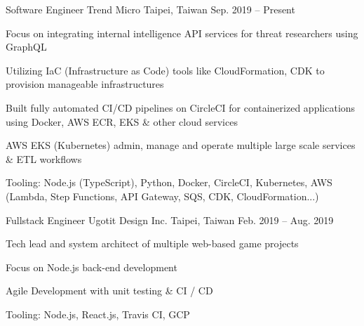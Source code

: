 

\begin{cventries}

  \cventry
    {Software Engineer} %
    {Trend Micro} %
    {Taipei, Taiwan} %
    {Sep. 2019 -- Present} %
    {
      \begin{cvitems} %
        \item {Focus on integrating internal intelligence API services for threat researchers using GraphQL}
        \item {Utilizing IaC (Infrastructure as Code) tools like CloudFormation, CDK to provision manageable infrastructures}
        \item {Built fully automated CI/CD pipelines on CircleCI for containerized applications using Docker, AWS ECR, EKS \& other cloud services}
        \item {AWS EKS (Kubernetes) admin, manage and operate multiple large scale services \& ETL workflows}
        \item {Tooling: Node.js (TypeScript), Python, Docker, CircleCI, Kubernetes, AWS (Lambda, Step Functions, API Gateway, SQS, CDK, CloudFormation...)}
      \end{cvitems}
    }

  \cventry
    {Fullstack Engineer} %
    {Ugotit Design Inc.} %
    {Taipei, Taiwan} %
    {Feb. 2019 -- Aug. 2019} %
    {
      \begin{cvitems} %
        \item {Tech lead and system architect of multiple web-based game projects}
        \item {Focus on Node.js back-end development}
        \item {Agile Development with unit testing \& CI / CD}
        \item {Tooling: Node.js, React.js, Travis CI, GCP}
      \end{cvitems}
    }


\end{cventries}
